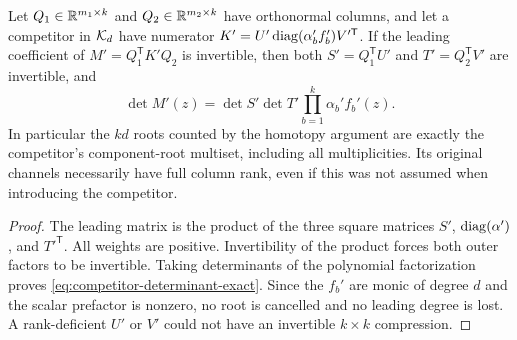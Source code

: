 \begin{lemma}\label{lem:competitor-rank}
Let $Q_1\in\mathbb R^{m_1\times k}$ and $Q_2\in\mathbb R^{m_2\times k}$ have
orthonormal columns, and let a competitor in $\mathcal K_d$ have numerator
$K'=U'\operatorname{diag}(\alpha_b'f_b')V'^{\mathsf T}$. If the leading coefficient
of $M'=Q_1^{\mathsf T}K'Q_2$ is invertible, then both
$S'=Q_1^{\mathsf T}U'$ and $T'=Q_2^{\mathsf T}V'$ are invertible, and
\begin{equation}\label{eq:competitor-determinant-exact}
 \det M'(z)=\det S'\det T'\prod_{b=1}^k\alpha_b'f_b'(z).
\end{equation}
In particular the $kd$ roots counted by the homotopy argument are
exactly the competitor's component-root multiset, including all
multiplicities. Its original channels necessarily have full column
rank, even if this was not assumed when introducing the competitor.
\end{lemma}
\begin{proof}
The leading matrix is the product of the three square matrices
$S'$, $\operatorname{diag}(\alpha')$, and $T'^{\mathsf T}$. All weights are positive.
Invertibility of the product forces both outer factors to be invertible.
Taking determinants of the polynomial factorization proves
\eqref{eq:competitor-determinant-exact}. Since the $f_b'$ are monic of
degree $d$ and the scalar prefactor is nonzero, no root is cancelled
and no leading degree is lost. A rank-deficient $U'$ or $V'$ could not
have an invertible $k\times k$ compression.
\end{proof}

